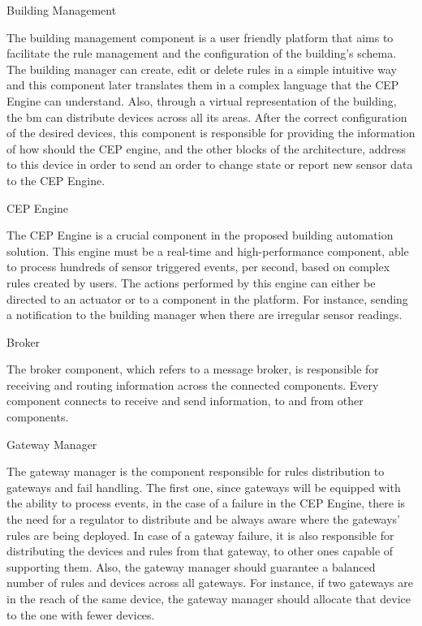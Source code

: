 \begin{Paragraph}{Building Management}
	
	The building management component is a user friendly platform that aims to facilitate the rule management and the configuration of the building's schema. The building manager can create, edit  or delete rules in a simple intuitive way and this component later translates them in a complex language that the CEP Engine can understand. Also, through a virtual representation of the building, the \ac{bm} can distribute devices across all its areas. After the correct configuration of the desired devices, this component is responsible for providing the information of how should the CEP engine, and the other blocks of the architecture, address to this device in order to send an order to change state or report new sensor data to the CEP Engine.
	
\end{Paragraph}

\begin{Paragraph}{CEP Engine}
	
The CEP Engine is a crucial component in the proposed building automation solution. This engine must be a real-time and high-performance component, able to process hundreds of sensor triggered events, per second, based on complex rules created by users. The actions performed by this engine can either be directed to an actuator or to a component in the platform. For instance, sending a notification to the building manager when there are irregular sensor readings.

	
	
\end{Paragraph}

\begin{Paragraph}{Broker}
	
	The broker component, which refers to a message broker, is responsible for receiving and routing information across the connected components. Every component connects to receive and send information, to and from other components.

	
\end{Paragraph}

\begin{Paragraph}{Gateway Manager}
	
	The gateway manager is the component responsible for rules distribution to gateways and fail handling. The first one, since gateways will be equipped with the ability to process events, in the case of a failure in the CEP Engine, there is the need for a regulator to distribute and be always aware where the gateways' rules are being deployed. In case of a gateway failure, it is also responsible for distributing the devices and rules from that gateway, to other ones capable of supporting them. Also, the gateway manager should guarantee a balanced number of rules and devices across all gateways. For instance, if two gateways are in the reach of the same device, the gateway manager should allocate that device to the one with fewer devices.
	
	
\end{Paragraph}

